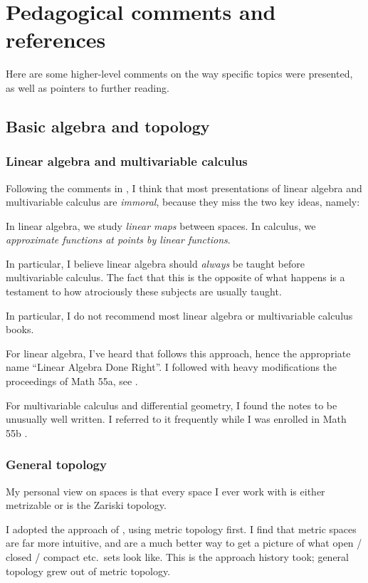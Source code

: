 \chapter{Pedagogical comments and references}
\label{ch:refs}
Here are some higher-level comments on the way specific topics were presented,
as well as pointers to further reading.

\section{Basic algebra and topology}
\subsection*{Linear algebra and multivariable calculus}
Following the comments in ,
I think that most presentations of linear algebra and multivariable calculus
are \emph{immoral}, because they miss the two key ideas, namely:
\begin{itemize}
	\ii In linear algebra, we study \emph{linear maps} between spaces.
	\ii In calculus, we \emph{approximate functions at points by linear functions}.
\end{itemize}
In particular, I believe linear algebra should \emph{always} be taught
before multivariable calculus.
The fact that this is the opposite of what happens is a testament to how
atrociously these subjects are usually taught.

In particular, I do not recommend most linear algebra or
multivariable calculus books.

For linear algebra, I've heard that \cite{ref:axler} follows this approach,
hence the appropriate name ``Linear Algebra Done Right''.
I followed with heavy modifications the proceedings of Math 55a,
see \cite{ref:55a}.

For multivariable calculus and differential geometry,
I found the notes \cite{ref:manifolds} to be unusually well written.
I referred to it frequently while I was enrolled in Math 55b \cite{ref:55b}.

\subsection*{General topology}
My personal view on spaces is that every space I ever work with
is either metrizable or is the Zariski topology.

I adopted the approach of \cite{ref:pugh}, using metric topology first.
I find that metric spaces are far more intuitive, and are a much better
way to get a picture of what open / closed / compact etc.\ sets look like.
This is the approach history took; general topology grew out of metric topology.

